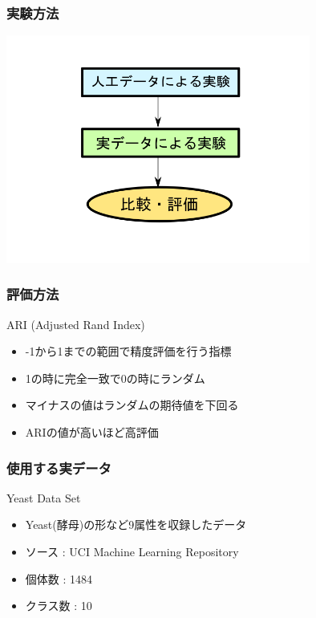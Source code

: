 \documentclass[13pt,dvipdfmx]{beamer}
\begin{document}
\begin{frame}\frametitle{実験方法}
\begin{center}
 \includegraphics[width=100mm]{experiment_process.png}
\end{center}
\end{frame}

\begin{frame}\frametitle{評価方法}
\begin{block}{ARI (Adjusted Rand Index)}
\begin{itemize}
 \item -1から1までの範囲で精度評価を行う指標
 \item 1の時に完全一致で0の時にランダム
 \item マイナスの値はランダムの期待値を下回る
 \item ARIの値が高いほど高評価
\end{itemize}
\end{block}
\begin{center}
\end{center}
\end{frame}

\begin{frame}\frametitle{使用する実データ}
  \begin{block}{Yeast Data Set}
    \begin{itemize}
    \item Yeast(酵母)の形など9属性を収録したデータ
    \item ソース : UCI  Machine Learning Repository
    \item 個体数 : 1484
    \item クラス数 : 10
    \end{itemize}
  \end{block}
\end{frame}
\end{document}
